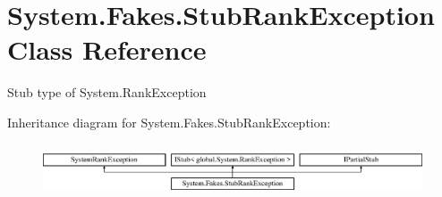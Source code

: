 \hypertarget{class_system_1_1_fakes_1_1_stub_rank_exception}{\section{System.\-Fakes.\-Stub\-Rank\-Exception Class Reference}
\label{class_system_1_1_fakes_1_1_stub_rank_exception}
}


Stub type of System.\-Rank\-Exception 


Inheritance diagram for System.\-Fakes.\-Stub\-Rank\-Exception\-:\begin{figure}[H]
\begin{center}
\leavevmode
\includegraphics[height=1.575246cm]{class_system_1_1_fakes_1_1_stub_rank_exception}
\end{center}
\end{figure}
